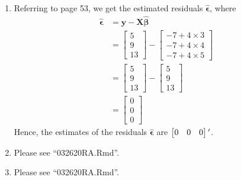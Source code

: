 \documentclass[10pt]{article}
\begin{document}
\begin{enumerate}[1)]
\item
Referring to page 53, we get the estimated residuals $\pmb{\hat{\epsilon}}$, where
\begin{align*}
\pmb{\hat{\epsilon}}&=\pmb{y}-\pmb{X\hat{\beta}}\\
&=
  \begin{bmatrix}
    5\\
    9\\
    13
  \end{bmatrix}
-
  \begin{bmatrix}
    -7+4\times3\\
    -7+4\times4\\
    -7+4\times5
  \end{bmatrix}
\\
&=
  \begin{bmatrix}
    5\\
    9\\
    13
  \end{bmatrix}
-
  \begin{bmatrix}
    5\\
    9\\
    13
  \end{bmatrix}
\\
&=
  \begin{bmatrix}
    0\\
    0\\
    0
  \end{bmatrix}
\end{align*}
Hence, the estimates of the residuals $\pmb{\hat{\epsilon}}$ are $
  \begin{bmatrix}
    0 & 0 & 0
  \end{bmatrix}\textsuperscript{$\prime$}$.

\item
Please see ``032620RA.Rmd''.

\item
Please see ``032620RA.Rmd''.

\end{enumerate}
\vspace{3mm}
\end{document}
